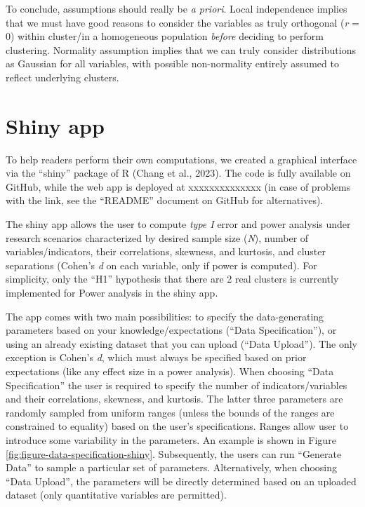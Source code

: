 \documentclass[
  man,floatsintext]{apa6}
\begin{document}
To conclude, assumptions should really be \emph{a priori}. Local independence implies that we must have good reasons to consider the variables as truly orthogonal (\emph{r} = 0) within cluster/in a homogeneous population \emph{before} deciding to perform clustering. Normality assumption implies that we can truly consider distributions as Gaussian for all variables, with possible non-normality entirely assumed to reflect underlying clusters.

\hypertarget{shiny-app}{%
\section{Shiny app}\label{shiny-app}}

To help readers perform their own computations, we created a graphical interface via the ``shiny'' package of R (Chang et al., 2023). The code is fully available on GitHub, while the web app is deployed at xxxxxxxxxxxxxx (in case of problems with the link, see the ``README'' document on GitHub for alternatives).

The shiny app allows the user to compute \emph{type I} error and power analysis under research scenarios characterized by desired sample size (\emph{N}), number of variables/indicators, their correlations, skewness, and kurtosis, and cluster separations (Cohen's \emph{d} on each variable, only if power is computed). For simplicity, only the ``H1'' hypothesis that there are 2 real clusters is currently implemented for Power analysis in the shiny app.

The app comes with two main possibilities: to specify the data-generating parameters based on your knowledge/expectations (``Data Specification''), or using an already existing dataset that you can upload (``Data Upload''). The only exception is Cohen's \emph{d}, which must always be specified based on prior expectations (like any effect size in a power analysis). When choosing ``Data Specification'' the user is required to specify the number of indicators/variables and their correlations, skewness, and kurtosis. The latter three parameters are randomly sampled from uniform ranges (unless the bounds of the ranges are constrained to equality) based on the user's specifications. Ranges allow user to introduce some variability in the parameters. An example is shown in Figure \ref{fig:figure-data-specification-shiny}. Subsequently, the users can run ``Generate Data'' to sample a particular set of parameters. Alternatively, when choosing ``Data Upload'', the parameters will be directly determined based on an uploaded dataset (only quantitative variables are permitted).
\end{document}
